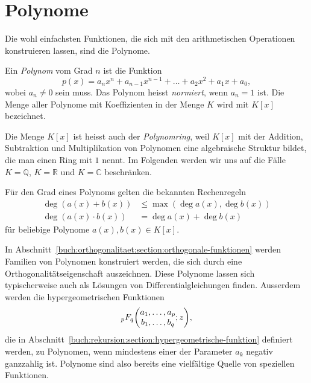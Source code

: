 %
%
%
\section{Polynome
\label{buch:potenzen:section:polynome}}
Die wohl einfachsten Funktionen, die sich mit den arithmetischen
Operationen konstruieren lassen, sind die Polynome.

\begin{definition}
%
Ein {\em Polynom} vom Grad $n$ ist die Funktion
\[
p(x) = a_nx^n + a_{n-1}x^{n-1} + \dots + a_2x^2 + a_1x + a_0,
\]
wobei $a_n\ne 0$ sein muss.
Das Polynom heisst {\em normiert}, wenn $a_n=1$ ist.
%
%
%
Die Menge aller Polynome mit Koeffizienten in der Menge $K$ wird mit
$K[x]$ bezeichnet.
\end{definition}

Die Menge $K[x]$ ist heisst auch der {\em Polynomring}, weil $K[x]$
%
mit der Addition, Subtraktion und Multiplikation von Polynomen eine
algebraische Struktur bildet, die man einen Ring mit $1$ nennt.
%
Im Folgenden werden wir uns auf die Fälle $K=\mathbb{Q}$, $K=\mathbb{R}$
und $K=\mathbb{C}$ beschränken.

Für den Grad eines Polynoms gelten die bekannten Rechenregeln
\begin{align*}
\deg (a(x) + b(x)) &\le \operatorname{max}(\deg a(x), \deg b(x))
\\
\deg (a(x)\cdot b(x)) &=\deg a(x) + \deg b(x)
\end{align*}
für beliebige Polynome $a(x),b(x)\in K[x]$.

In Abschnitt~\ref{buch:orthogonalitaet:section:orthogonale-funktionen} werden
Familien von Polynomen konstruiert werden, die sich durch eine
Orthogonalitätseigenschaft auszeichnen.
Diese Polynome lassen sich typischerweise auch als Lösungen von
Differentialgleichungen finden.
Ausserdem werden die hypergeometrischen Funktionen
\[
\mathstrut_pF_q\biggl(
\begin{matrix}a_1,\dots,a_p\\b_1,\dots,b_q\end{matrix};z
\biggr),
\] die in
Abschnitt~\ref{buch:rekursion:section:hypergeometrische-funktion}
definiert werden, zu Polynomen, wenn mindestens einer der
Parameter $a_k$ negativ ganzzahlig ist.
Polynome sind also bereits eine vielfältige Quelle von speziellen
Funktionen.

